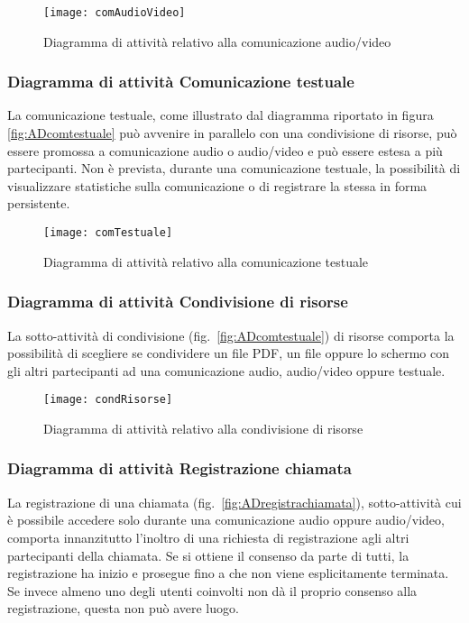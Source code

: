 \begin{figure}[H]
  \centering
  \texttt{[image: comAudioVideo]}
  \caption{Diagramma di attività relativo alla comunicazione audio/video}\label{fig:ADcomaudiovideo}
\end{figure}

\subsubsection{Diagramma di attività Comunicazione testuale}
La comunicazione testuale, come illustrato dal diagramma riportato in figura \vref{fig:ADcomtestuale} può avvenire in parallelo con una condivisione di risorse, può essere promossa a comunicazione audio o audio/video e può essere estesa a più partecipanti. Non è prevista, durante una comunicazione testuale, la possibilità di visualizzare statistiche sulla comunicazione o di registrare la stessa in forma persistente.

\begin{figure}[H]
  \centering
  \texttt{[image: comTestuale]}
  \caption{Diagramma di attività relativo alla comunicazione testuale}\label{fig:ADcomtestuale}
\end{figure}

\subsubsection{Diagramma di attività Condivisione di risorse}
La sotto-attività di condivisione (fig.~\vref{fig:ADcomtestuale}) di risorse comporta la possibilità di scegliere se condividere un file PDF, un file oppure lo schermo con gli altri partecipanti ad una comunicazione audio, audio/video oppure testuale.

\begin{figure}[H]
  \centering
  \texttt{[image: condRisorse]}
  \caption{Diagramma di attività relativo alla condivisione di risorse}\label{fig:ADcondrisorse}
\end{figure}

\subsubsection{Diagramma di attività Registrazione chiamata}
La registrazione di una chiamata (fig.~\vref{fig:ADregistrachiamata}), sotto-attività cui è possibile accedere solo durante una comunicazione audio oppure audio/video, comporta innanzitutto l'inoltro di una richiesta di registrazione agli altri partecipanti della chiamata. Se si ottiene il consenso da parte di tutti, la registrazione ha inizio e prosegue fino a che non viene esplicitamente terminata. Se invece almeno uno degli utenti coinvolti non dà il proprio consenso alla registrazione, questa non può avere luogo.

